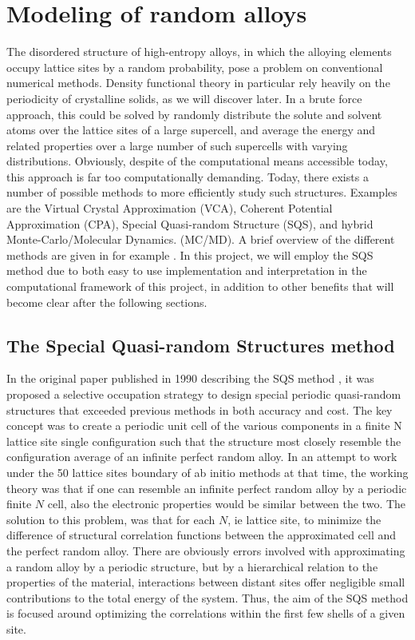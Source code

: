 \chapter{Modeling of random alloys}
\label{sec:SQS}

The disordered structure of high-entropy alloys, in which the alloying elements occupy lattice sites by a random probability, pose a problem on conventional numerical methods. Density functional theory in particular rely heavily on the periodicity of crystalline solids, as we will discover later. In a brute force approach, this could be solved by randomly distribute the solute and solvent atoms over the lattice sites of a large supercell, and average the energy and related properties over a large number of such supercells with varying distributions. Obviously, despite of the computational means accessible today, this approach is far too computationally demanding. Today, there exists a number of possible methods to more efficiently study such structures. Examples are the Virtual Crystal Approximation (VCA), Coherent Potential Approximation (CPA), Special Quasi-random Structure (SQS), and hybrid Monte-Carlo/Molecular Dynamics. (MC/MD). A brief overview of the different methods are given in for example \cite{sqsIntro}. In this project, we will employ the SQS method due to both easy to use implementation and interpretation in the computational framework of this project, in addition to other benefits that will become clear after the following sections.             

\section{The Special Quasi-random Structures method}
In the original paper published in 1990 describing the SQS method \cite{sqsfull}, it was proposed a selective occupation strategy to design special periodic quasi-random structures that exceeded previous methods in both accuracy and cost. The key concept was to create a periodic unit cell of the various components in a finite N lattice site single configuration such that the structure most closely resemble the configuration average of an infinite perfect random alloy. In an attempt to work under the 50 lattice sites boundary of ab initio methods at that time, the working theory was that if one can resemble an infinite perfect random alloy by a periodic finite $N$ cell, also the electronic properties would be similar between the two. The solution to this problem, was that for each $N$, ie lattice site, to minimize the difference of structural correlation functions between the approximated cell and the perfect random alloy. There are obviously errors involved with approximating a random alloy by a periodic structure, but by a hierarchical relation to the properties of the material, interactions between distant sites offer negligible small contributions to the total energy of the system. Thus, the aim of the SQS method is focused around optimizing the correlations within the first few shells of a given site. 

